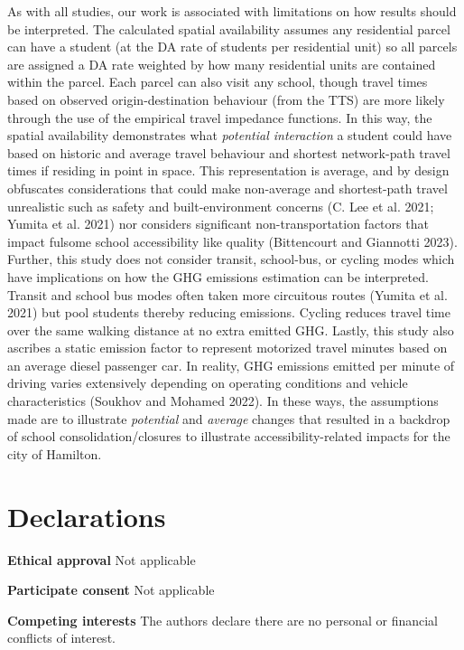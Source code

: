 \documentclass[
default
]{sn-jnl}
\begin{document}
As with all studies, our work is associated with limitations on how
results should be interpreted. The calculated spatial availability
assumes any residential parcel can have a student (at the DA rate of
students per residential unit) so all parcels are assigned a DA rate
weighted by how many residential units are contained within the parcel.
Each parcel can also visit any school, though travel times based on
observed origin-destination behaviour (from the TTS) are more likely
through the use of the empirical travel impedance functions. In this
way, the spatial availability demonstrates what \emph{potential
interaction} a student could have based on historic and average travel
behaviour and shortest network-path travel times if residing in point in
space. This representation is average, and by design obfuscates
considerations that could make non-average and shortest-path travel
unrealistic such as safety and built-environment concerns (C. Lee et al.
2021; Yumita et al. 2021) nor considers significant non-transportation
factors that impact fulsome school accessibility like quality
(Bittencourt and Giannotti 2023). Further, this study does not consider
transit, school-bus, or cycling modes which have implications on how the
GHG emissions estimation can be interpreted. Transit and school bus
modes often taken more circuitous routes (Yumita et al. 2021) but pool
students thereby reducing emissions. Cycling reduces travel time over
the same walking distance at no extra emitted GHG. Lastly, this study
also ascribes a static emission factor to represent motorized travel
minutes based on an average diesel passenger car. In reality, GHG
emissions emitted per minute of driving varies extensively depending on
operating conditions and vehicle characteristics (Soukhov and Mohamed
2022). In these ways, the assumptions made are to illustrate
\emph{potential} and \emph{average} changes that resulted in a backdrop
of school consolidation/closures to illustrate accessibility-related
impacts for the city of Hamilton.

\section{Declarations}\label{declarations}

\textbf{Ethical approval} Not applicable

\textbf{Participate consent} Not applicable

\textbf{Competing interests} The authors declare there are no personal
or financial conflicts of interest.
\end{document}
